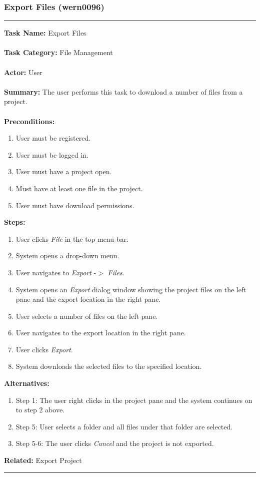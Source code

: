 \documentclass[11pt]{report}
\begin{document}
\subsubsection{Export Files (wern0096)}
\vspace{2pt}
\hrule
\vspace{8pt}
	\noindent\textbf{Task Name:} Export Files \\ \\
	\textbf{Task Category:} File Management \\ \\
	\textbf{Actor:} User \\ \\
	\textbf{Summary:} The user performs this task to download a number of files from a project. \\ \\
	\textbf{Preconditions:} 
	\begin{enumerate}
		\item User must be registered.
		\item User must be logged in.
		\item User must have a project open.
		\item Must have at least one file in the project.
		\item User must have download permissions.
	\end{enumerate}
	\textbf{Steps:}
	\begin{enumerate}
		\item User clicks \textit{File} in the top menu bar.
		\item System opens a drop-down menu.
		\item User navigates to \textit{Export} -$>$ \textit{Files}.
		\item System opens an \textit{Export} dialog window showing the project files on the left pane and the export location in the right pane.
		\item User selects a number of files on the left pane.
		\item User navigates to the export location in the right pane.
		\item User clicks \textit{Export}.
		\item System downloads the selected files to the specified location.
	\end{enumerate}
	\textbf{Alternatives:} 
	\begin{enumerate}
		\item Step 1: The user right clicks in the project pane and the system continues on to step 2 above.
		\item Step 5: User selects a folder and all files under that folder are selected.
		\item Step 5-6: The user clicks \textit{Cancel} and the project is not exported.
	\end{enumerate}
	\textbf{Related:} Export Project
\vspace{8pt}
\hrule
\newpage
\end{document}
